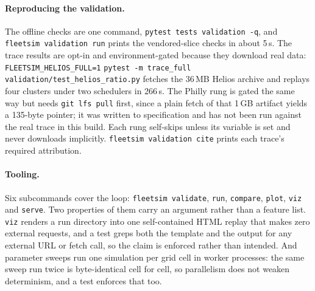 \paragraph{Reproducing the validation.} The offline checks are one command,
\texttt{pytest tests validation -q}, and \texttt{fleetsim validation run}
prints the vendored-slice checks in about 5\,s. The trace results are opt-in
and environment-gated because they download real data:
\texttt{FLEETSIM\_HELIOS\_FULL=1} \texttt{pytest -m trace\_full}
\texttt{validation/test\_helios\_ratio.py} fetches the 36\,MB Helios archive
\cite{helios2021} and replays four clusters under two schedulers in 266\,s.
The Philly rung \cite{philly2019} is gated the same way but needs \texttt{git
lfs pull} first, since a plain fetch of that 1\,GB artifact yields a 135-byte
pointer; it was written to specification and has not been run against the real
trace in this build. Each rung self-skips unless its variable is set and never
downloads implicitly. \texttt{fleetsim validation cite} prints each trace's
required attribution.

\paragraph{Tooling.} Six subcommands cover the loop: \texttt{fleetsim
validate}, \texttt{run}, \texttt{compare}, \texttt{plot}, \texttt{viz} and
\texttt{serve}. Two properties of them carry an argument rather than a feature
list. \texttt{viz} renders a run directory into one self-contained HTML replay
that makes zero external requests, and a test greps both the template and the
output for any external URL or fetch call, so the claim is enforced rather than
intended. And parameter sweeps run one simulation per grid cell in worker
processes: the same sweep run twice is byte-identical cell for cell, so
parallelism does not weaken determinism, and a test enforces that too.
